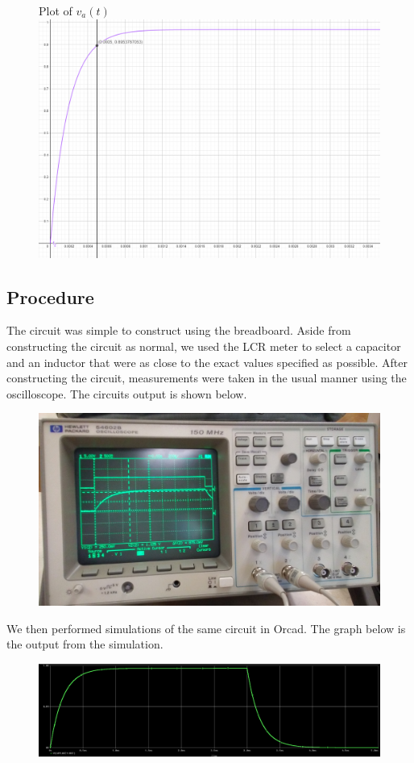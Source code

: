\documentclass[11pt]{article}
\begin{document}
	\begin{figure}[H]
		\centering
		Plot of $v_a(t)$\\
		\includegraphics[width=6.55in]{images/function_graph.png}
	\end{figure}
	
	\subsection*{Procedure}
	The circuit was simple to construct using the breadboard. Aside from constructing the circuit as normal, we used the LCR meter to select a capacitor and an inductor that were as close to the exact values specified as possible. After constructing the circuit, measurements were taken in the usual manner using the oscilloscope. The circuits output is shown below.
		\begin{figure}[H]
		\centering
		\includegraphics[width=5in]{images/oscilloscope_transfer.jpg}
		\end{figure}
	We then performed simulations of the same circuit in Orcad. The graph below is the output from the simulation.
		\begin{figure}[H]
		\centering
		\includegraphics[width=6in]{images/simulated_curve.png}
		\end{figure}
\end{document}
